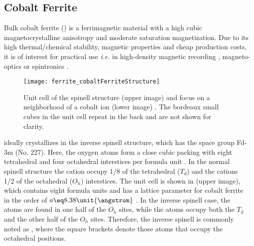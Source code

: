 \documentclass[\main/dresen_thesis.tex]{subfiles}
\begin{document}
\subsection{Cobalt Ferrite}\label{ch:theoreticalBackground:cobaltferrite}
  Bulk cobalt ferrite () is a ferrimagnetic material with a high cubic magnetocrystalline anisotropy and moderate saturation magnetization.
  Due to its high thermal/chemical stability, magnetic properties and cheap production costs, it is of interest for practical use \textit{i.e.} in high-density magnetic recording \cite{Wu_2014_Monol}, magneto-optics \cite{Jung_2005_CoFe2} or spintronics \cite{Ramos_2007_Roomt}.

  \begin{figure}[tb]
    \centering
    \texttt{[image: ferrite\_cobaltFerriteStructure]}
    \caption{\label{fig:theoreticalBackground:ferrites:cofe2o4Structure}Unit cell of the spinell structure  (upper image) \cite{Sickafus_1999_Struc} and focus on a neighborhood of a cobalt ion (lower image) \cite{Tachiki_1960_Origi}. The bordeaux small cubes in the unit cell repeat in the back and are not shown for clarity.}
  \end{figure}

   ideally crystallizes in the inverse spinell structure, which has the space group Fd-3m (No. 227).
  Here, the oxygen atoms form a close cubic packing with eight tetrahedral and four octahedral interstices per formula unit \cite{Sickafus_1999_Struc}.
  In the normal spinell structure  the  cation occupy 1/8 of the tetrahedral ($T_d$) and the  cations 1/2 of the octahedral ($O_h$) interstices.
  The unit cell is shown in  (upper image), which contains eight formula units and has a lattice parameter for cobalt ferrite in the order of $a \eq 8.38 \unit{\angstrom}$ \cite{Goldman_1999_Cryst}.
  In the inverse spinell case, the  atoms are found in one half of the $O_h$ sites, while the  atoms occupy both the $T_d$ and the other half of the $O_h$ sites.
  Therefore, the inverse spinell is commonly noted as , where the square brackets denote those atoms that occupy the octahedral positions.
\end{document}
